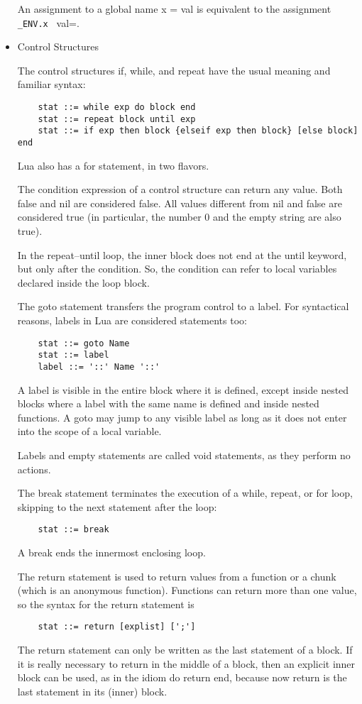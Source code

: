 \begin{itemize}
An assignment to a global name x = val is equivalent to the assignment \verb=_ENV.x = val=.

\item Control Structures

The control structures if, while, and repeat have the usual meaning and familiar syntax:
\begin{lstlisting}
	stat ::= while exp do block end
	stat ::= repeat block until exp
	stat ::= if exp then block {elseif exp then block} [else block] end
\end{lstlisting}
Lua also has a for statement, in two flavors.

The condition expression of a control structure can return any value. Both false and nil are considered false. All values different from nil and false are considered true (in particular, the number 0 and the empty string are also true).

In the repeat–until loop, the inner block does not end at the until keyword, but only after the condition. So, the condition can refer to local variables declared inside the loop block.

The goto statement transfers the program control to a label. For syntactical reasons, labels in Lua are considered statements too:
\begin{lstlisting}
	stat ::= goto Name
	stat ::= label
	label ::= '::' Name '::'
\end{lstlisting}

A label is visible in the entire block where it is defined, except inside nested blocks where a label with the same name is defined and inside nested functions. A goto may jump to any visible label as long as it does not enter into the scope of a local variable.

Labels and empty statements are called void statements, as they perform no actions.

The break statement terminates the execution of a while, repeat, or for loop, skipping to the next statement after the loop:
\begin{lstlisting}
	stat ::= break
\end{lstlisting}
A break ends the innermost enclosing loop.

The return statement is used to return values from a function or a chunk (which is an anonymous function). Functions can return more than one value, so the syntax for the return statement is
\begin{lstlisting}
	stat ::= return [explist] [';']
\end{lstlisting}
The return statement can only be written as the last statement of a block. If it is really necessary to return in the middle of a block, then an explicit inner block can be used, as in the idiom do return end, because now return is the last statement in its (inner) block.


\end{itemize}
